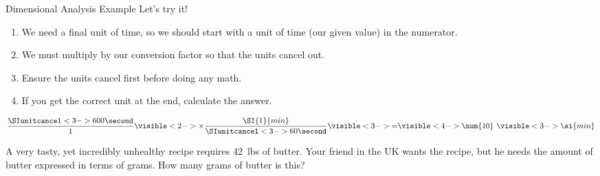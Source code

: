 \documentclass[10pt,letterpaper,twoside]{article}
\begin{document}
\begin{frame}{Dimensional Analysis Example}
	Let's try it!

	\begin{enumerate}[<+->]
		\item We need a final unit of time, so we should start with a
			unit of time (our given value) in the \alert{numerator}.
		\item We must multiply by our conversion factor so that
			the units \alert{cancel out}.
		\item Ensure the units cancel \alert{first} before doing any
			math.
		\item If you get the correct unit at the end, calculate the
			answer.
	\end{enumerate}

	\begin{equation*}
		\frac{\SIunitcancel<3->{600}{\second}}{1} \visible<2->{\times
		\frac{\SI{1}{min}}{\SIunitcancel<3->{60}{\second}}}
		\visible<3->{=} \visible<4->{\num{10}}~\visible<3->{\si{min}}
	\end{equation*}
\end{frame}

\clearpage

\begin{onyourown}%
	A very tasty, yet incredibly unhealthy recipe requires \SI{42}{lbs} of
	butter. Your friend in the UK wants the recipe, but he needs the amount
	of butter expressed in terms of grams. How many grams of butter is this?
\end{onyourown}

\end{document}
